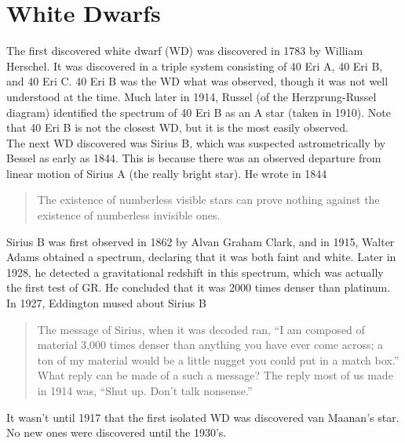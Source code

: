 \documentclass[10pt]{article}
\numberwithin{equation}{section}
\newcommand{\n}{\noindent}
\begin{document}
	\section{White Dwarfs} %
	\label{sec:white_dwarfs}
	The first discovered white dwarf (WD) was discovered in 1783 by William Herschel. It was discovered in a triple system consisting of 40 Eri A, 40 Eri B, and 40 Eri C. 40 Eri B was the WD what was observed, though it was not well understood at the time. Much later in 1914, Russel (of the Herzprung-Russel diagram) identified the spectrum of 40 Eri B as an A star (taken in 1910). Note that 40 Eri B is not the closest WD, but it is the most easily observed.\\
	
	\n The next WD discovered was Sirius B, which was suspected astrometrically by Bessel as early as 1844. This is because there was an observed departure from linear motion of Sirius A (the really bright star). He wrote in 1844 \begin{quote} The existence of numberless visible stars can prove nothing against the existence of numberless invisible ones. \end{quote} Sirius B was first observed in 1862 by Alvan Graham Clark, and in 1915, Walter Adams obtained a spectrum, declaring that it was both faint and white. Later in 1928, he detected a gravitational redshift in this spectrum, which was actually the first test of GR. He concluded that it was 2000 times denser than platinum.\\
	
	\n In 1927, Eddington mused about Sirius B \begin{quote} The message of Sirius, when it was decoded ran, ``I am composed of material 3,000 times denser than anything you have ever come across; a ton of my material would be a little nugget you could put in a match box.'' What reply can be made of a such a message? The reply most of us made in 1914 was, ``Shut up. Don't talk nonsense.'' \end{quote}
	It wasn't until 1917 that the first isolated WD was discovered van Maanan's star. No new ones were discovered until the 1930's.
\end{document}
